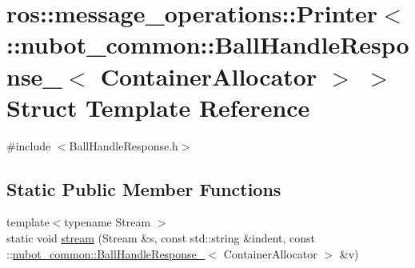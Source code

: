 \hypertarget{structros_1_1message__operations_1_1Printer_3_01_1_1nubot__common_1_1BallHandleResponse___3_01ContainerAllocator_01_4_01_4}{\section{ros\-:\-:message\-\_\-operations\-:\-:Printer$<$ \-:\-:nubot\-\_\-common\-:\-:Ball\-Handle\-Response\-\_\-$<$ Container\-Allocator $>$ $>$ Struct Template Reference}
\label{structros_1_1message__operations_1_1Printer_3_01_1_1nubot__common_1_1BallHandleResponse___3_01ContainerAllocator_01_4_01_4}
}


{\ttfamily \#include $<$Ball\-Handle\-Response.\-h$>$}

\subsection*{Static Public Member Functions}
\begin{DoxyCompactItemize}
\item 
{\footnotesize template$<$typename Stream $>$ }\\static void \hyperlink{structros_1_1message__operations_1_1Printer_3_01_1_1nubot__common_1_1BallHandleResponse___3_01ContainerAllocator_01_4_01_4_a2b1615ce84a7116c7d22515209b9b491}{stream} (Stream \&s, const std\-::string \&indent, const \-::\hyperlink{structnubot__common_1_1BallHandleResponse__}{nubot\-\_\-common\-::\-Ball\-Handle\-Response\-\_\-}$<$ Container\-Allocator $>$ \&v)
\end{DoxyCompactItemize}


